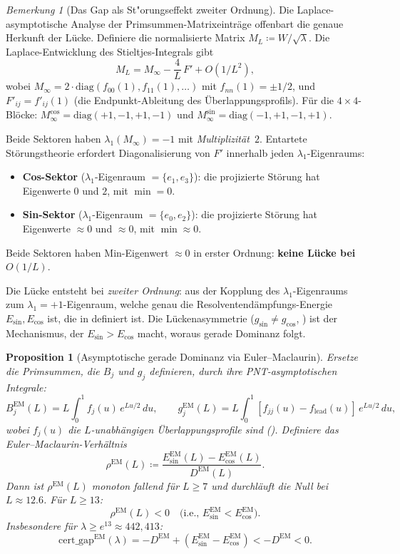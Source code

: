 \documentclass[12pt,a4paper]{article}
\newtheorem{proposition}[theorem]{Proposition}
\theoremstyle{definition}
\theoremstyle{remark}
\newtheorem{remark}[theorem]{Bemerkung}
\begin{document}
\begin{remark}[Das Gap als St"orungseffekt zweiter Ordnung]
\label{rem:gap-source}
Die Laplace-asymptotische Analyse der Primsummen-Matrixeinträge offenbart die genaue Herkunft der Lücke. Definiere die normalisierte Matrix $M_L \coloneqq W / \sqrt{\lambda}$. Die Laplace-Entwicklung des Stieltjes-Integrals gibt
\[
  M_L = M_\infty - \frac{4}{L}\,F' + O(1/L^2),
\]
wobei $M_\infty = 2 \cdot \mathrm{diag}(f_{00}(1), f_{11}(1), \ldots)$ mit $f_{nn}(1) = \pm 1/2$, und $F'_{ij} = f'_{ij}(1)$ (die Endpunkt-Ableitung des Überlappungsprofils). Für die $4 \times 4$-Blöcke: $M_\infty^{\cos} = \mathrm{diag}(+1,-1,+1,-1)$ und $M_\infty^{\sin} = \mathrm{diag}(-1,+1,-1,+1)$.

Beide Sektoren haben $\lambda_1(M_\infty) = -1$ mit \emph{Multiplizität~$2$}. Entartete Störungstheorie erfordert Diagonalisierung von $F'$ innerhalb jeden $\lambda_1$-Eigenraums:
\begin{itemize}
  \item \textbf{Cos-Sektor} ($\lambda_1$-Eigenraum $= \{e_1, e_3\}$): die projizierte Störung hat Eigenwerte $0$ und $2$, mit $\min = 0$.
  \item \textbf{Sin-Sektor} ($\lambda_1$-Eigenraum $= \{e_0, e_2\}$): die projizierte Störung hat Eigenwerte $\approx 0$ und $\approx 0$, mit $\min \approx 0$.
\end{itemize}
Beide Sektoren haben Min-Eigenwert $\approx 0$ in erster Ordnung: \textbf{keine Lücke bei $O(1/L)$}.

Die Lücke entsteht bei \emph{zweiter Ordnung}: aus der Kopplung des $\lambda_1$-Eigenraums zum $\lambda_1 = +1$-Eigenraum, welche genau die Resolventendämpfungs-Energie $E_{\sin}, E_{\cos}$ ist, die in  definiert ist. Die Lückenasymmetrie ($g_{\sin} \neq g_{\cos}$, ) ist der Mechanismus, der $E_{\sin} > E_{\cos}$ macht, woraus gerade Dominanz folgt.
\end{remark}

\begin{proposition}[Asymptotische gerade Dominanz via Euler--Maclaurin]
\label{prop:euler-maclaurin}
Ersetze die Primsummen, die $B_j$ und $g_j$ definieren, durch ihre PNT-asymptotischen Integrale:
\[
  B_j^{\mathrm{EM}}(L) = L\!\int_0^1 f_j(u)\,e^{Lu/2}\,du, \qquad
  g_j^{\mathrm{EM}}(L) = L\!\int_0^1 [f_{jj}(u) - f_{\mathrm{lead}}(u)]\,e^{Lu/2}\,du,
\]
wobei $f_j(u)$ die $L$-unabhängigen Überlappungsprofile sind (). Definiere das Euler--Maclaurin-Verhältnis
\[
  \rho^{\mathrm{EM}}(L) \coloneqq \frac{E_{\sin}^{\mathrm{EM}}(L) - E_{\cos}^{\mathrm{EM}}(L)}{D^{\mathrm{EM}}(L)}.
\]
Dann ist $\rho^{\mathrm{EM}}(L)$ monoton fallend für $L \geq 7$ und durchläuft die Null bei $L \approx 12.6$. Für $L \geq 13$:
\[
  \rho^{\mathrm{EM}}(L) < 0 \quad\text{(i.e., } E_{\sin}^{\mathrm{EM}} < E_{\cos}^{\mathrm{EM}}\text{)}.
\]
Insbesondere für $\lambda \geq e^{13} \approx 442{,}413$:
\[
  \mathrm{cert\_gap}^{\mathrm{EM}}(\lambda) = -D^{\mathrm{EM}} + (E_{\sin}^{\mathrm{EM}} - E_{\cos}^{\mathrm{EM}}) < -D^{\mathrm{EM}} < 0.
\]
\end{proposition}
\end{document}
